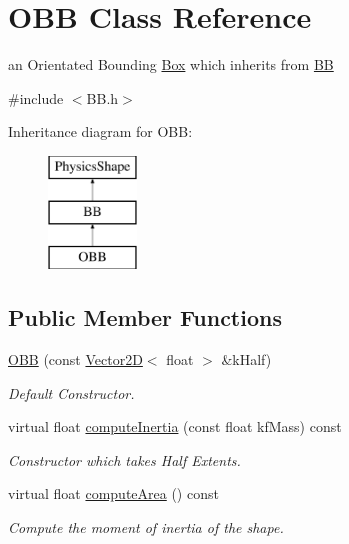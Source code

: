 \hypertarget{class_o_b_b}{\section{O\+B\+B Class Reference}
\label{class_o_b_b}
}


an Orientated Bounding \hyperlink{class_box}{Box} which inherits from \hyperlink{class_b_b}{B\+B}  




{\ttfamily \#include $<$B\+B.\+h$>$}

Inheritance diagram for O\+B\+B\+:\begin{figure}[H]
\begin{center}
\leavevmode
\includegraphics[height=3.000000cm]{class_o_b_b}
\end{center}
\end{figure}
\subsection*{Public Member Functions}
\begin{DoxyCompactItemize}
\item 
\hypertarget{class_o_b_b_a587dbcad47e99aa38ee6fc4168e710a5}{\hyperlink{class_o_b_b_a587dbcad47e99aa38ee6fc4168e710a5}{O\+B\+B} (const \hyperlink{class_vector2_d}{Vector2\+D}$<$ float $>$ \&k\+Half)}\label{class_o_b_b_a587dbcad47e99aa38ee6fc4168e710a5}

\begin{DoxyCompactList}\small\item\em Default Constructor. \end{DoxyCompactList}\item 
\hypertarget{class_o_b_b_a11ee7dd0ba7b814f63183a1b538de85a}{virtual float \hyperlink{class_o_b_b_a11ee7dd0ba7b814f63183a1b538de85a}{compute\+Inertia} (const float kf\+Mass) const }\label{class_o_b_b_a11ee7dd0ba7b814f63183a1b538de85a}

\begin{DoxyCompactList}\small\item\em Constructor which takes Half Extents. \end{DoxyCompactList}\item 
\hypertarget{class_o_b_b_adb59b9c3293c41afdb5646a7482ce181}{virtual float \hyperlink{class_o_b_b_adb59b9c3293c41afdb5646a7482ce181}{compute\+Area} () const }\label{class_o_b_b_adb59b9c3293c41afdb5646a7482ce181}

\begin{DoxyCompactList}\small\item\em Compute the moment of inertia of the shape. \end{DoxyCompactList}\end{DoxyCompactItemize}
